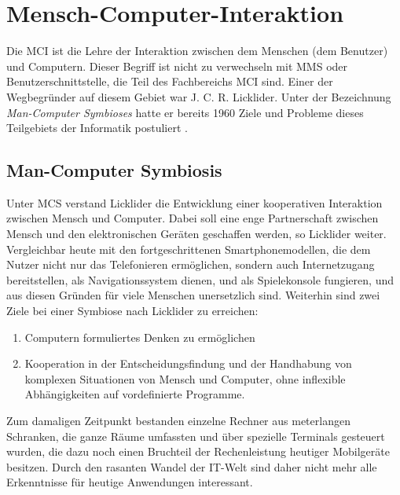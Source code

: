 \chapter{Mensch-Computer-Interaktion}
\label{chap:MenschComputerInteraktion}

Die \gls{MCI} ist die Lehre der Interaktion zwischen dem Menschen (dem Benutzer) und Computern. Dieser Begriff ist nicht zu verwechseln mit \gls{MMS} oder Benutzerschnittstelle, die Teil des Fachbereichs \gls{MCI} sind.
\newline
Einer der Wegbegr\"under auf diesem Gebiet war J. C. R. Licklider. Unter der Bezeichnung \textit{Man-Computer Symbioses} hatte er bereits 1960 Ziele und Probleme dieses Teilgebiets der Informatik postuliert \cite{bib:Lick_Symbiosis}. 

\section{Man-Computer Symbiosis}
Unter \gls{MCS} verstand Licklider die Entwicklung einer kooperativen Interaktion zwischen Mensch und Computer. Dabei soll eine enge Partnerschaft zwischen Mensch und den elektronischen Ger\"aten geschaffen werden, so Licklider weiter. Vergleichbar heute mit den fortgeschrittenen Smartphonemodellen, die dem Nutzer nicht nur das Telefonieren erm\"oglichen, sondern auch Internetzugang bereitstellen, als Navigationssystem dienen, und als Spielekonsole fungieren, und aus diesen Gr\"unden f\"ur viele Menschen unersetzlich sind.
Weiterhin sind zwei Ziele bei einer Symbiose nach Licklider zu erreichen:
\begin{enumerate}
\item Computern formuliertes Denken zu erm\"oglichen
\item Kooperation in der Entscheidungsfindung und der Handhabung von komplexen Situationen von Mensch und Computer, ohne inflexible Abh\"angigkeiten auf vordefinierte Programme.
\end{enumerate}
Zum damaligen Zeitpunkt bestanden einzelne Rechner aus meterlangen Schranken, die ganze R\"aume umfassten und \"uber spezielle Terminals gesteuert wurden, die dazu noch einen Bruchteil der Rechenleistung heutiger Mobilger\"ate besitzen. Durch den rasanten Wandel der IT-Welt sind daher nicht mehr alle Erkenntnisse f\"ur heutige Anwendungen interessant.


